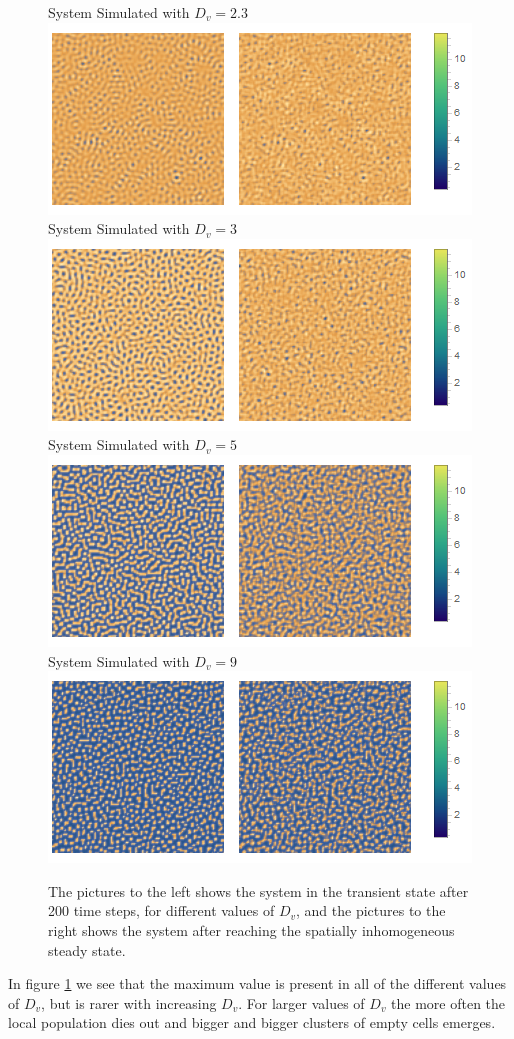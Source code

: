\begin{figure}[h]
\centering
System Simulated with $D_v=2.3$\\
\includegraphics[scale=0.5]{img/2bd23Comb.png}\\
System Simulated with $D_v=3$\\
\includegraphics[scale=0.5]{img/2bd3Comb.png}\\
System Simulated with $D_v=5$\\
\includegraphics[scale=0.5]{img/2bd5Comb.png}\\
System Simulated with $D_v=9$\\
\includegraphics[scale=0.5]{img/2bd9Comb.png}\\
\caption{\label{fig:pic2b} The pictures to the left shows the system in the transient state after 200 time steps, for different values of $D_v$, and the pictures to the right shows the system after reaching the spatially inhomogeneous steady state.}
\end{figure}

In figure \ref{fig:pic2b} we see that the maximum value is present in all of the different values of $D_v$, but is rarer with increasing $D_v$. For larger values of $D_v$ the more often the local population dies out and bigger and bigger clusters of empty cells emerges.
